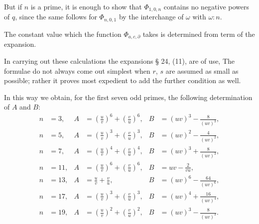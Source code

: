 But if $n$ is a prime, it is enough to show that $\Phi_{1,0,n}$
contains no negative powers of $q$, since the same follows for
$\Phi_{n,0,1}$ by the interchange of $\omega$ with $\omega:n$.

The constant value which the function $\Phi_{a,c,\partial}$ takes is
determined from  term of the expansion.

In carrying out these calculations the expansions § 24, (11), are of use,
The formulae do not always come out simplest when $r$, $s$ are
assumed as small as possible; rather it proves most expedient to add
the further condition
as well.

In this way we obtain, for the first seven odd primes, the
following determination of $A$ and $B$:
\[
\begin{aligned}
n &= 3, & A &= \left(\frac{u}{v}\right)^6 + \left(\frac{v}{u}\right)^6, & B &= (uv)^3 - \frac{8}{(uv)^3}, \\
n &= 5, & A &= \left(\frac{u}{v}\right)^3 + \left(\frac{v}{u}\right)^3, & B &= (uv)^2 - \frac{4}{(uv)^2}, \\
n &= 7, & A &= \left(\frac{u}{v}\right)^4 + \left(\frac{v}{u}\right)^4, & B &= (uv)^3 + \frac{8}{(uv)^3}, \\
n &= 11, & A &= \left(\frac{u}{v}\right)^6 + \left(\frac{v}{u}\right)^6, & B &= uv - \frac{2}{vu}, \\
n &= 13, & A &= \frac{u}{v} + \frac{v}{u}, & B &= (uv)^6 - \frac{64}{(uv)^6}, \\
n &= 17, & A &= \left(\frac{u}{v}\right)^3 + \left(\frac{v}{u}\right)^3, & B &= (uv)^4 + \frac{16}{(uv)^4}, \\
n &= 19, & A &= \left(\frac{u}{v}\right)^2 + \left(\frac{v}{u}\right)^2, & B &= (uv)^3 - \frac{8}{(uv)^3}.
\end{aligned}
\]

